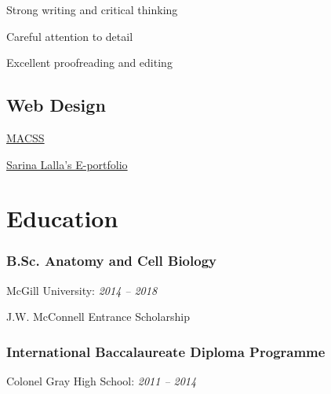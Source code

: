 \documentclass[%
	12pt,%
	]
	{article}
\begin{document}
Strong writing and critical thinking

Careful attention to detail

Excellent proofreading and editing

\subsection*{Web Design}
\href{https://jidicula.github.io/macssmcgill/index.html}{MACSS}

\href{https://sarinalalla.github.io/}{Sarina Lalla's E-portfolio}

\section*{Education}
\subsubsection*{B.Sc. Anatomy and Cell Biology}
McGill University: \emph{2014 -- 2018}

J.W. McConnell Entrance Scholarship

\subsubsection*{International Baccalaureate Diploma Programme}
Colonel Gray High School: \emph{2011 -- 2014}
\end{document}
